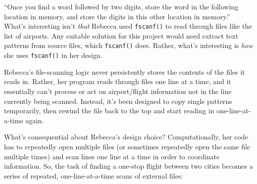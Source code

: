 \begin{Shaded}
\end{Shaded}

``Once you find a word followed by two digits, store the word in the following location in memory, and store the digits in this other location in memory.'' What's interesting isn't \emph{that} Rebecca used \texttt{fscanf()} to read through files like the list of airports. Any suitable solution for this project would need extract text patterns from source files, which \texttt{fscanf()} does. Rather, what's interesting is \emph{how} she uses \texttt{fscanf()} in her design.

Rebecca's file-scanning logic never persistently stores the contents of the files it reads in. Rather, her program reads through files one line at a time, and it essentially can't process or act on airport/flight information not in the line currently being scanned. Instead, it's been designed to copy single patterns temporarily, then rewind the file back to the top and start reading in one-line-at-a-time again.

What's consequential about Rebecca's design choice? Computationally, her code has to repeatedly open multiple files (or sometimes repeatedly open the same file multiple times) and scan lines one line at a time in order to coordinate information. So, the task of finding a one-stop flight between two cities becomes a series of repeated, one-line-at-a-time scans of external files:

